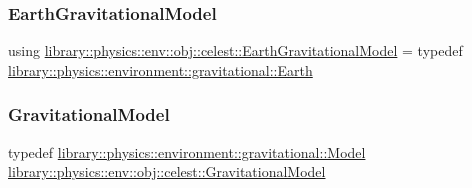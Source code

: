 \subsubsection{\texorpdfstring{Earth\+Gravitational\+Model}{EarthGravitationalModel}}
{\footnotesize\ttfamily using \hyperlink{namespacelibrary_1_1physics_1_1env_1_1obj_1_1celest_ae5b7a35477a26407f850ec326fb2b2fd}{library\+::physics\+::env\+::obj\+::celest\+::\+Earth\+Gravitational\+Model} = typedef \hyperlink{classlibrary_1_1physics_1_1environment_1_1gravitational_1_1_earth}{library\+::physics\+::environment\+::gravitational\+::\+Earth}}

\mbox{\label{namespacelibrary_1_1physics_1_1env_1_1obj_1_1celest_ac63145c8cbe868bd79be8f6f423c8cf4}} 
\subsubsection{\texorpdfstring{Gravitational\+Model}{GravitationalModel}}
{\footnotesize\ttfamily typedef \hyperlink{classlibrary_1_1physics_1_1environment_1_1gravitational_1_1_model}{library\+::physics\+::environment\+::gravitational\+::\+Model} \hyperlink{namespacelibrary_1_1physics_1_1env_1_1obj_1_1celest_ac63145c8cbe868bd79be8f6f423c8cf4}{library\+::physics\+::env\+::obj\+::celest\+::\+Gravitational\+Model}}

